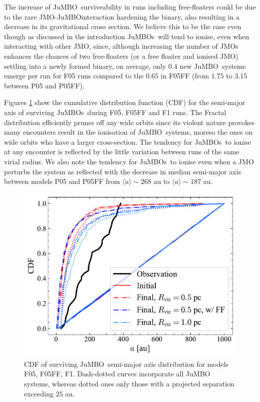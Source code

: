 \documentclass[submission,phys]{lib/SciPost}
\newcommand{\jumbo}{\mbox{JuMBO}}
\newcommand{\jumbos}{\mbox{JuMBOs}}
\begin{document}
    The increase of \jumbo\, surviveability in runs including free-floaters could be due to the rare JMO-\jumbo interaction hardening the binary, also resulting in a decrease in its gravitational cross section. We believe this to be the case even though as discussed in the introduction \jumbos\, will tend to ionise, even when interacting with other JMO, since, although increasing the number of JMOs enhances the chances of two free-floaters (or a free floater and ionised JMO) settling into a newly formed binary, on average, only $0.4$ new \jumbo\, systems emerge per run for F05 runs compared to the $0.65$ in F05FF (from $1.75$ to $3.15$ between P05 and P05FF). 
    
    Figures \ref{Fig:Gen_Semi_Fractal} show the cumulative distribution function (CDF) for the semi-major axis of surviving \jumbos\, during F05, F05FF and F1 runs. The Fractal distribution efficiently prunes off any wide orbits since its violent nature provokes many encounters result in the ionisation of \jumbo\, systems, moreso the ones on wide orbits who have a larger cross-section. The tendency for \jumbos\, to ionise at any encounter is reflected by the little variation between runs of the same virial radius. We also note the tendency for \jumbos\, to ionise even when a JMO perturbs the system as reflected with the decrease in median semi-major axis between models P05 and P05FF from $\langle a\rangle\sim268$ au to $\langle a\rangle\sim187$ au.
   
   \begin{figure}
    \centering
        \includegraphics[width=\columnwidth]{figures/Fractal_General_sem_axis.pdf}
        \caption{CDF of surviving \jumbo\, semi-major axis distribution for models F05, F05FF, F1. Dash-dotted curves incorporate all \jumbo\, systems, whereas dotted ones only those with a projected separation exceeding $25$ au.}
         \label{Fig:Gen_Semi_Fractal}
   \end{figure}
    
\end{document}
